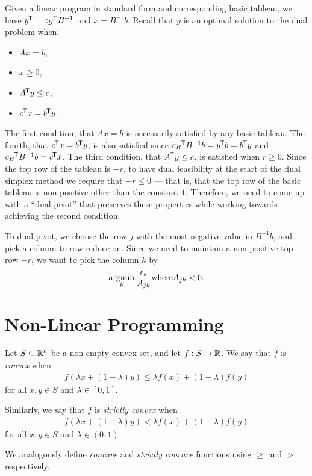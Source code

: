 Given a linear program in standard form and corresponding basic tableau, we have ${y}^{\mkern-1.5mu\mathsf{T}} = {c_B}^{\mkern-1.5mu\mathsf{T}}B^{-1}$ and $x = B^{-1}b$. Recall that $y$ is an optimal solution to the dual problem when:
\begin{itemize}
    \item $Ax = b$,
    \item $x \geq 0$,
    \item ${A}^{\mkern-1.5mu\mathsf{T}}y \leq c$,
    \item ${c}^{\mkern-1.5mu\mathsf{T}}x = {b}^{\mkern-1.5mu\mathsf{T}}y$.
\end{itemize}

The first condition, that $Ax = b$ is necessarily satisfied by any basic tableau. The fourth, that ${c}^{\mkern-1.5mu\mathsf{T}}x = {b}^{\mkern-1.5mu\mathsf{T}}y$, is also satisfied since ${c_B}^{\mkern-1.5mu\mathsf{T}}B^{-1}b = {y}^{\mkern-1.5mu\mathsf{T}}b = {b}^{\mkern-1.5mu\mathsf{T}}y$ and ${c_B}^{\mkern-1.5mu\mathsf{T}}B^{-1}b = {c}^{\mkern-1.5mu\mathsf{T}}x$. The third condition, that ${A}^{\mkern-1.5mu\mathsf{T}}y \leq c$, is satisfied when $r \geq 0$. Since the top row of the tableau is $-r$, to have dual feasibility at the start of the dual simplex method we require that $-r \leq 0$ --- that is, that the top row of the basic tableau is non-positive other than the constant $1$. Therefore, we need to come up with a ``dual pivot'' that preserves these properties while working towards achieving the second condition.

To dual pivot, we choose the row $j$ with the most-negative value in $B^{-1}b$, and pick a column to row-reduce on. Since we need to maintain a non-positive top row $-r$, we want to pick the column $k$ by \[\operatorname*{argmin}_{k}\frac{r_k}{A_{jk}} \mathrm{ where } A_{jk} < 0.\]

\section{Non-Linear Programming}

\begin{defn}
    Let $S \subseteq \mathbb{R}^n$ be a non-empty convex set, and let $f: S \to \mathbb{R}$. We say that $f$ is \emph{convex} when
    \begin{align*}
        f\left(\lambda x + (1 - \lambda)y\right) \leq \lambda f(x) + (1 - \lambda)f(y)
    \end{align*}
    for all $x, y \in S$ and $\lambda \in [0, 1]$.

    Similarly, we say that $f$ is \emph{strictly convex} when
    \begin{align*}
        f\left(\lambda x + (1 - \lambda)y\right) < \lambda f(x) + (1 - \lambda)f(y)
    \end{align*}
    for all $x, y \in S$ and $\lambda \in (0, 1)$.

    We analogously define \emph{concave} and \emph{strictly concave} functions using $\geq$ and $>$ respectively.
\end{defn}

